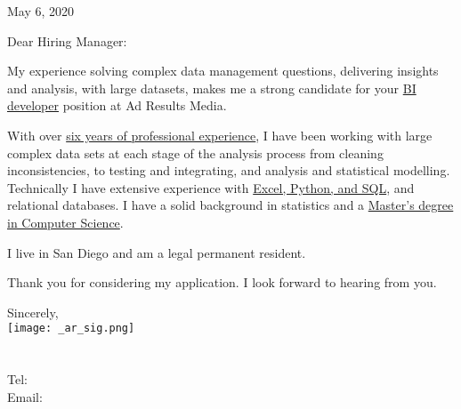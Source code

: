 \documentclass[letterpaper]{article}
\newcommand{\impt}[1]{\uline{#1}}
\newcommand{\CVjobTitle}{BI developer}
\newcommand{\CVcompany}{Ad Results Media}
\begin{document}
\large

\null\hfill May 6, 2020
\vspace{1em}

Dear Hiring Manager:

\iffalse
Ad Results Media is seeking a BI developer to work within our Analytics
department. This individual will report to the head of analytics and be will
both be involved in analytics as well as support of the client services team.
This role will be involved in supporting client analytic needs, developing
client reporting tools as well as ad-hoc analytic projects.  We are seeking a
self-motivated, detail-oriented person who enjoys thinking through and creating
solutions for complex problems.  This person enjoys working in a fast-paced
environment and wants to help build and shape the analytics department for an
established yet growing, organization.

\fi

My experience solving complex data management questions,
delivering insights and analysis,
with large datasets,
makes me a strong candidate for your \impt{\CVjobTitle} position at \CVcompany.

With over \impt{six years of professional experience}, I have been working with
large complex data sets at each stage of the analysis process from cleaning
inconsistencies, to testing and integrating, and analysis and statistical
modelling.
Technically I have extensive experience with \impt{Excel, 
Python, and SQL}, and relational databases.
I have a solid background in statistics and a \impt{Master's degree in Computer
Science}.

I live in San Diego and am a legal permanent resident.  

Thank you for considering my application.
I look forward to hearing from you.  


Sincerely,\\
    \hspace{1em} 
    \texttt{[image: \_ar\_sig.png]} \\
    \CVname \\
    \small
    \CVaddresswrap \\
    Tel: \CVphone \\
    Email: \CVemail
\end{document}
